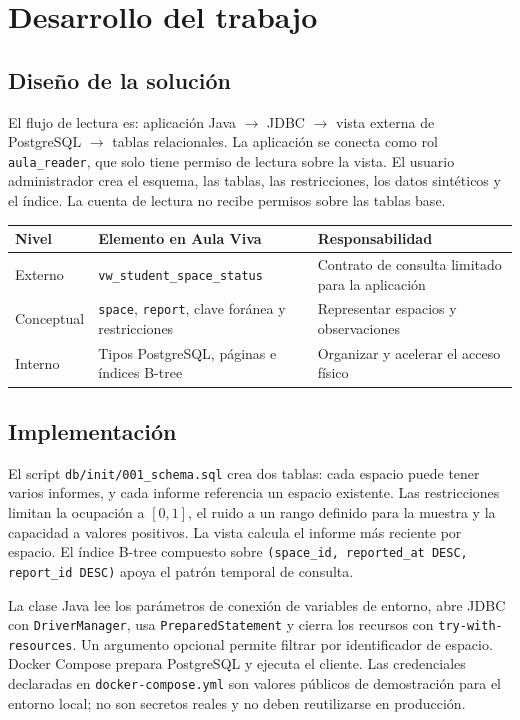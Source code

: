 \documentclass[a4paper,12pt]{article}
\begin{document}
\section{Desarrollo del trabajo}
\subsection{Diseño de la solución}
El flujo de lectura es: aplicación Java \(\rightarrow\) JDBC \(\rightarrow\) vista externa de PostgreSQL \(\rightarrow\) tablas relacionales. La aplicación se conecta como rol \texttt{aula\_reader}, que solo tiene permiso de lectura sobre la vista. El usuario administrador crea el esquema, las tablas, las restricciones, los datos sintéticos y el índice. La cuenta de lectura no recibe permisos sobre las tablas base.

\begin{center}\small
\begin{tabularx}{\textwidth}{lXX}\toprule
Nivel & Elemento en Aula Viva & Responsabilidad \\\midrule
Externo & \texttt{vw\_student\_space\_status} & Contrato de consulta limitado para la aplicación \\
Conceptual & \texttt{space}, \texttt{report}, clave foránea y restricciones & Representar espacios y observaciones \\
Interno & Tipos PostgreSQL, páginas e índices B-tree & Organizar y acelerar el acceso físico \\
\bottomrule
\end{tabularx}
\end{center}

\subsection{Implementación}
El script \texttt{db/init/001\_schema.sql} crea dos tablas: cada espacio puede tener varios informes, y cada informe referencia un espacio existente. Las restricciones limitan la ocupación a \([0,1]\), el ruido a un rango definido para la muestra y la capacidad a valores positivos. La vista calcula el informe más reciente por espacio. El índice B-tree compuesto sobre \texttt{(space\_id, reported\_at DESC, report\_id DESC)} apoya el patrón temporal de consulta.

La clase Java lee los parámetros de conexión de variables de entorno, abre JDBC con \texttt{DriverManager}, usa \texttt{PreparedStatement} y cierra los recursos con \texttt{try-with-resources}. Un argumento opcional permite filtrar por identificador de espacio. Docker Compose prepara PostgreSQL y ejecuta el cliente. Las credenciales declaradas en \texttt{docker-compose.yml} son valores públicos de demostración para el entorno local; no son secretos reales y no deben reutilizarse en producción.
\end{document}
